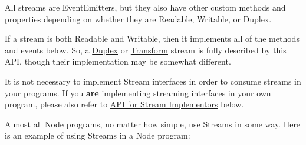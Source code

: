 All streams are EventEmitters, but they also have other custom methods
and properties depending on whether they are Readable, Writable, or
Duplex.

If a stream is both Readable and Writable, then it implements all of the
methods and events below. So, a
\hyperref[streamux5fclassux5fstreamux5fduplex]{Duplex} or
\hyperref[streamux5fclassux5fstreamux5ftransform]{Transform} stream is
fully described by this API, though their implementation may be somewhat
different.

It is not necessary to implement Stream interfaces in order to consume
streams in your programs. If you \textbf{are} implementing streaming
interfaces in your own program, please also refer to
\hyperref[streamux5fapiux5fforux5fstreamux5fimplementors]{API for Stream
Implementors} below.

Almost all Node programs, no matter how simple, use Streams in some way.
Here is an example of using Streams in a Node program:

